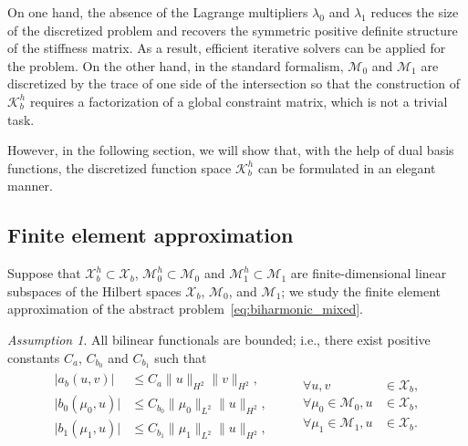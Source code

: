 \documentclass[preprint,12pt]{elsarticle}
\theoremstyle{remark}
\newtheorem{assumption}{Assumption}
\begin{document}
On one hand, the absence of the Lagrange multipliers $\lambda_0$ and $\lambda_1$ reduces the size of the discretized problem and recovers the symmetric positive definite structure of the stiffness matrix. As a result, efficient iterative solvers can be applied for the problem. On the other hand, in the standard formalism, $\mathcal{M}_0$ and $\mathcal{M}_1$ are discretized by the trace of one side of the intersection so that the construction of $\mathcal{K}_b^h$ requires a factorization of a global constraint matrix, which is not a trivial task. \par
However, in the following section, we will show that, with the help of dual basis functions, the discretized function space $\mathcal{K}_b^h$ can be formulated in an elegant manner.

\subsection{Finite element approximation}
Suppose that $\mathcal{X}_b^h\subset{\mathcal{X}_b}$, $\mathcal{M}_0^h\subset{\mathcal{M}_0}$ and $\mathcal{M}_1^h\subset{\mathcal{M}_1}$ are finite-dimensional linear subspaces of the Hilbert spaces $\mathcal{X}_b$, $\mathcal{M}_0$, and $\mathcal{M}_1$; we study the finite element approximation of the abstract problem~\eqref{eq:biharmonic_mixed}.
\begin{assumption}
    All bilinear functionals are bounded; i.e.,  there exist positive constants $C_a$, $C_{b_0}$ and $C_{b_1}$ such that
    \begin{align}\label{aspt:bounded-operator}
        \begin{split}
        \vert{a_b{(u,v)}}\vert&\leq{C_a\|u\|_{H^2}\|v\|_{H^2}},\\
        \vert{b_0{(\mu_0,u)}}\vert&\leq{C_{b_0}\|\mu_0\|_{L^2}\|u\|_{H^2}},\\
        \vert{b_1{(\mu_1,u)}}\vert&\leq{C_{b_1}\|\mu_1\|_{L^2}\|u\|_{H^2}},
        \end{split}
        \quad\quad
        \begin{split}
            \forall{u,v}&\in{\mathcal{X}_b},\\
            \forall{\mu_0}\in\mathcal{M}_0, {u}&\in{\mathcal{X}_b},\\
            \forall{\mu_1}\in\mathcal{M}_1, {u}&\in{\mathcal{X}_b}.                                                                                        
        \end{split}
    \end{align} 
\end{assumption}
\end{document}
